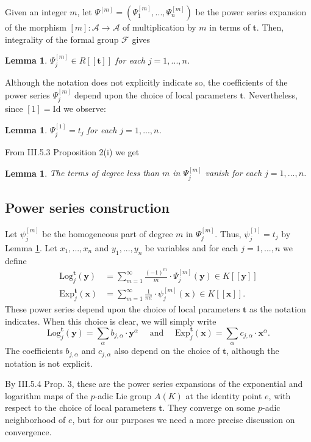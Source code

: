 \documentclass[11pt]{amsart}
\newtheorem{lemma}[theorem]{Lemma}
\theoremstyle{remark}
\numberwithin{equation}{section}
\newcommand{\Acal}{\mathscr{A}}
\newcommand{\Fcal}{\mathscr{F}}
\newcommand{\xx}{\mathbf{x}}
\newcommand{\yy}{\mathbf{y}}
\newcommand{\ttt}{\mathbf{t}}
\newcommand{\Exp}{\mathrm{Exp}}
\newcommand{\Log}{\mathrm{Log}}
\newcommand{\Id}{\mathrm{Id}}
\begin{document}
Given an integer $m$, let $\Psi^{[m]}=(\Psi^{[m]}_1,...,\Psi^{[m]}_n)$ be the power series expansion of the morphism $[m]:\Acal\to \Acal$ of multiplication by $m$ in terms of $\ttt$. Then, integrality of the formal group $\Fcal$ gives
\begin{lemma}\label{LemmaPsiR} $\Psi^{[m]}_j\in R[[\ttt]]$ for each $j=1,...,n$. 
\end{lemma}

Although the notation does not explicitly indicate so, the coefficients of the power series $\Psi^{[m]}_j$  depend upon the choice of local parameters $\ttt$. Nevertheless, since $[1]=\Id$ we observe:
\begin{lemma}\label{LemmaLinearPart} $\Psi^{[1]}_j =t_j$ for each $j=1,...,n$.
\end{lemma}
  From \cite{Bourbaki} III.5.3 Proposition 2(i) we get
\begin{lemma}\label{LemmaVanishPsi} The terms of degree less than $m$ in $\Psi^{[m]}_j$ vanish for each $j=1,...,n$.
\end{lemma}

\subsection{Power series construction} \label{SecLogExp2} Let $\psi^{[m]}_j$ be the homogeneous part of degree $m$ in $\Psi_j^{[m]}$. Thus, $\psi_j^{[1]} = t_j$ by Lemma \ref{LemmaLinearPart}. Let $x_1,...,x_n$ and $y_1,...,y_n$ be variables and for each $j=1,...,n$ we define 
$$
\begin{aligned}
\Log^{\ttt}_j(\yy) & = \sum_{m=1}^\infty \frac{(-1)^m}{m}\cdot \Psi^{[m]}_j(\yy)\in K[[\yy]]\\
\Exp^{\ttt}_j(\xx) & = \sum_{m=1}^\infty \frac{1}{m!}\cdot \psi^{[m]}_j(\xx)\in K[[\xx]].
\end{aligned}
$$
These power series depend upon the choice of local parameters $\ttt$ as the notation indicates. When this choice is clear, we will simply write
$$
\Log^\ttt_j(\yy)=\sum_\alpha b_{j,\alpha}\cdot \yy^\alpha \quad \mbox{ and }\quad \Exp^\ttt_j(\xx)=\sum_\alpha c_{j,\alpha}\cdot \xx^\alpha.
$$
The coefficients $b_{j,\alpha}$ and $c_{j,\alpha}$ also depend on the choice of $\ttt$, although the notation is not explicit.

By \cite{Bourbaki} III.5.4 Prop. 3, these are the power series expansions of the exponential and logarithm maps of the $p$-adic Lie group $A(K)$ at the identity point $e$, with respect to the choice of local parameters $\ttt$. They converge on some $p$-adic neighborhood of $e$, but for our purposes we need a more precise discussion on convergence.
\end{document}
